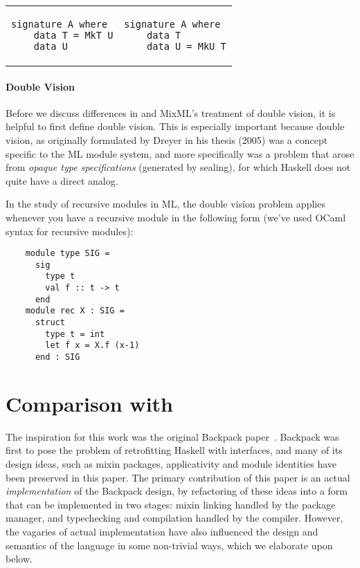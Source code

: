 \begin{tabular}{p{} p{}}
\begin{verbatim}
signature A where
    data T = MkT U
    data U
\end{verbatim}
&
\begin{verbatim}
signature A where
    data T
    data U = MkU T
\end{verbatim}
\end{tabular}

\paragraph{Double Vision}

Before we discuss differences in \Backpack{} and MixML's treatment of
double vision, it is helpful to first define double vision.  This
is especially important because double vision, as originally formulated
by Dreyer in his thesis (2005) was a concept specific to the ML module
system, and more specifically was a problem that arose from \emph{opaque type
specifications} (generated by sealing), for which Haskell does not quite
have a direct analog.

In the study of recursive modules in ML, the double vision problem applies
whenever you have a recursive module in the following form (we've used OCaml
syntax for recursive modules):

\begin{verbatim}
    module type SIG =
      sig
        type t
        val f :: t -> t
      end
    module rec X : SIG =
      struct
        type t = int
        let f x = X.f (x-1)
      end : SIG
\end{verbatim}


\section{Comparison with \OldBackpack{}}

The inspiration for this
work was the original Backpack paper~\cite{backpack}.  Backpack was
first to pose the problem of retrofitting Haskell with interfaces, and
many of its design ideas, such as mixin packages, applicativity and
module identities have been preserved in this paper.  The primary contribution
of this paper is an actual \emph{implementation} of the
Backpack design, by refactoring of these ideas into a form that can be
implemented in two stages: mixin linking handled by the package manager,
and typechecking and compilation handled by the compiler.  However,
the vagaries of actual implementation have also influenced the design
and semantics of the language in some non-trivial ways, which we elaborate
upon below.

